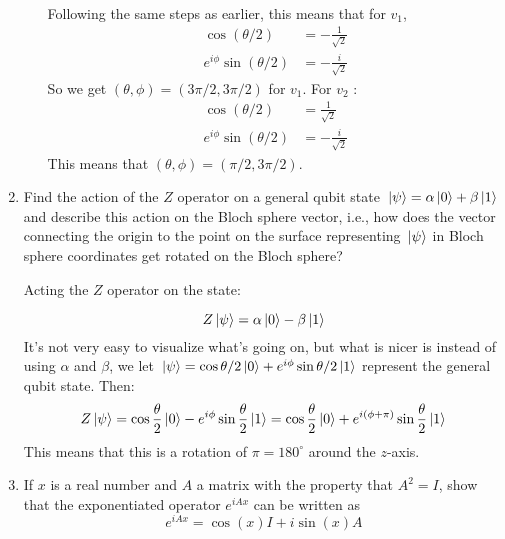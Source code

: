 \documentclass[10pt]{article}
\begin{document}
\begin{enumerate}[label=\alph*)]
\begin{solution}
\begin{itemize}
\begin{align*}
						\end{align*} 
						Following the same steps as earlier, this means that for \( v_1 \),  	
						\begin{align*}
							\cos(\theta / 2) &= -\frac{1}{\sqrt{2} }\\
							e^{i\phi}\sin(\theta /2) &= -\frac{i}{\sqrt{2} }
						\end{align*}
						So we get \( (\theta, \phi) = (3 \pi /2, 3\pi / 2) \) for \( v_1 \). For \( v_2 \) : 
						\begin{align*}
							\cos(\theta /2) &= \frac{1}{\sqrt{2} }\\
							e^{i \phi}\sin(\theta /2) &= -\frac{i}{\sqrt{2} }
						\end{align*}
						This means that \( (\theta, \phi) = (\pi /2, 3\pi / 2) \). 
				\end{itemize}
			\end{solution}
		\item Find the action of the \( Z \) operator on a general qubit state \( \ket*{\psi} = \alpha\ket*{0} + 
			\beta\ket*{1}\) and describe this action on the Bloch sphere vector, i.e., how does the vector connecting 
			the origin to the point on the surface representing \( \ket*{\psi} \) in Bloch sphere coordinates
			get rotated on the Bloch sphere?

			\begin{solution}
				Acting the \( Z \) operator on the state:

				\[
				Z \ket*{\psi} = \alpha \ket*{0} - \beta\ket*{1}
				\] 
				It's not very easy to visualize what's going on, but what is nicer is instead of using 
				\( \alpha \) and \( \beta \), we let \( \ket*{\psi} = \cos \theta / 2 \ket*{0} +
				e^{ i \phi} \sin \theta / 2 \ket*{1}\) represent the general qubit state. Then:
				\[
				Z\ket*{\psi} = \cos \frac{\theta}{2}\ket*{0} - e^{i \phi} \sin \frac{\theta}{2} \ket*{1}
				= \cos \frac{\theta}{2} \ket*{0}
				+ e^{i (\phi + \pi)} \sin \frac{\theta}{2} \ket*{1}
				\]  
				This means that this is a rotation of \( \pi = 180^\circ \) around the \( z \)-axis. 
			\end{solution}
		\item If \( x \) is a real number and \( A \) a matrix with the property that \( A^2 = I \), show that the 
			exponentiated operator \( e^{iAx} \) can be written as 
			\[
			e^{iAx} = \cos(x)I + i \sin(x) A
			\] 
			

\end{enumerate}
\end{document}

